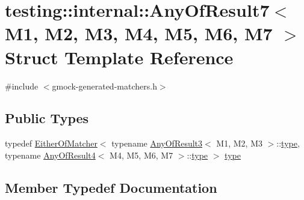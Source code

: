 \hypertarget{structtesting_1_1internal_1_1_any_of_result7}{}\section{testing\+:\+:internal\+:\+:Any\+Of\+Result7$<$ M1, M2, M3, M4, M5, M6, M7 $>$ Struct Template Reference}
\label{structtesting_1_1internal_1_1_any_of_result7}


{\ttfamily \#include $<$gmock-\/generated-\/matchers.\+h$>$}

\subsection*{Public Types}
\begin{DoxyCompactItemize}
\item 
typedef \hyperlink{classtesting_1_1internal_1_1_either_of_matcher}{Either\+Of\+Matcher}$<$ typename \hyperlink{structtesting_1_1internal_1_1_any_of_result3}{Any\+Of\+Result3}$<$ M1, M2, M3 $>$\+::\hyperlink{structtesting_1_1internal_1_1_any_of_result7_a976873478921520833464a86f840abe8}{type}, typename \hyperlink{structtesting_1_1internal_1_1_any_of_result4}{Any\+Of\+Result4}$<$ M4, M5, M6, M7 $>$\+::\hyperlink{structtesting_1_1internal_1_1_any_of_result7_a976873478921520833464a86f840abe8}{type} $>$ \hyperlink{structtesting_1_1internal_1_1_any_of_result7_a976873478921520833464a86f840abe8}{type}
\end{DoxyCompactItemize}


\subsection{Member Typedef Documentation}
\mbox{\label{structtesting_1_1internal_1_1_any_of_result7_a976873478921520833464a86f840abe8}} 
